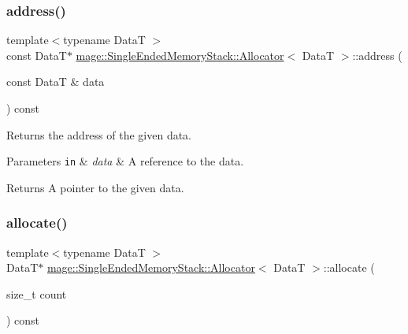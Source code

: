 \subsubsection{\texorpdfstring{address()}{address()}\hspace{0.1cm}{\footnotesize\ttfamily [2/2]}}
{\footnotesize\ttfamily template$<$typename DataT $>$ \\
const DataT$\ast$ \hyperlink{structmage_1_1_single_ended_memory_stack_1_1_allocator}{mage\+::\+Single\+Ended\+Memory\+Stack\+::\+Allocator}$<$ DataT $>$\+::address (\begin{DoxyParamCaption}\item[{const DataT \&}]{data }\end{DoxyParamCaption}) const\hspace{0.3cm}{\ttfamily [noexcept]}}

Returns the address of the given data.


\begin{DoxyParams}[1]{Parameters}
\mbox{\tt in}  & {\em data} & A reference to the data. \\
\hline
\end{DoxyParams}
\begin{DoxyReturn}{Returns}
A pointer to the given data. 
\end{DoxyReturn}
\hypertarget{structmage_1_1_single_ended_memory_stack_1_1_allocator_a076727a4db2bd233d80ccbc5f01b84e5}{}\label{structmage_1_1_single_ended_memory_stack_1_1_allocator_a076727a4db2bd233d80ccbc5f01b84e5} 
\subsubsection{\texorpdfstring{allocate()}{allocate()}\hspace{0.1cm}{\footnotesize\ttfamily [1/2]}}
{\footnotesize\ttfamily template$<$typename DataT $>$ \\
DataT$\ast$ \hyperlink{structmage_1_1_single_ended_memory_stack_1_1_allocator}{mage\+::\+Single\+Ended\+Memory\+Stack\+::\+Allocator}$<$ DataT $>$\+::allocate (\begin{DoxyParamCaption}\item[{size\+\_\+t}]{count }\end{DoxyParamCaption}) const}

